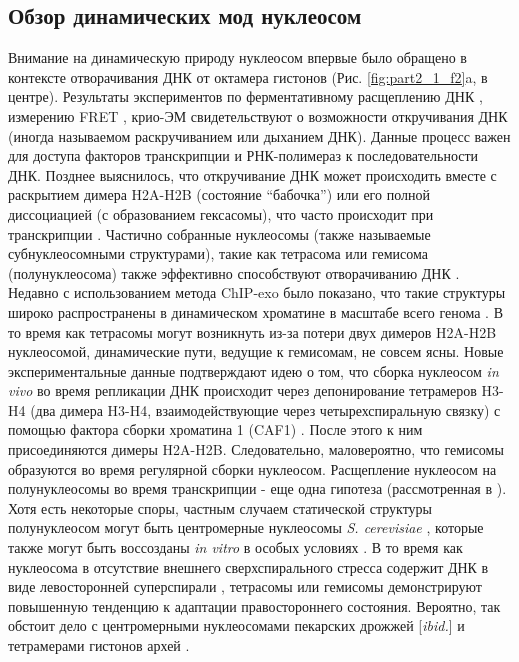 \subsection{Обзор динамических мод нуклеосом}

    Внимание на динамическую природу нуклеосом впервые было обращено в контексте отворачивания ДНК от октамера гистонов \cite{polach_mechanism_1995} (Рис. \ref{fig:part2_1_f2}a, в центре). Результаты экспериментов по ферментативному расщеплению ДНК \cite{polach_mechanism_1995}, измерению FRET \cite{li_nucleosomes_2004}, крио-ЭМ \cite{bilokapic_histone_2018} свидетельствуют о возможности откручивания ДНК (иногда называемом раскручиванием или дыханием ДНК). Данные процесс важен для доступа факторов транскрипции \cite{zaret_pioneer_2016,li_nucleosomes_2004} и РНК-полимераз \cite{bondarenko_nucleosomes_2006} к последовательности ДНК. Позднее выяснилось, что откручивание ДНК может происходить вместе с раскрытием димера H2A-H2B (состояние ``бабочка'') \cite{bohm_nucleosome_2011} или его полной диссоциацией (с образованием гексасомы), что часто происходит при транскрипции \cite{kireeva_nucleosome_2002}. Частично собранные нуклеосомы (также называемые субнуклеосомными структурами), такие как тетрасома или гемисома (полунуклеосома) также эффективно способствуют отворачиванию ДНК \cite{rychkov_partially_2017}. Недавно с использованием метода ChIP-exo было показано, что такие структуры широко распространены в динамическом хроматине в масштабе всего генома  \cite{rhee_subnucleosomal_2014}. В то время как тетрасомы могут возникнуть из-за потери двух димеров H2A-H2B нуклеосомой, динамические пути, ведущие к гемисомам, не совсем ясны. Новые экспериментальные данные подтверждают идею о том, что сборка нуклеосом \textit{in vivo} во время репликации ДНК происходит через депонирование тетрамеров H3-H4 (два димера H3-H4, взаимодействующие через четырехспиральную связку) с помощью фактора сборки хроматина 1 (CAF1) \cite{sauer_insights_2017,mattiroli_dna-mediated_2017}. После этого к ним присоединяются димеры H2A-H2B. Следовательно, маловероятно, что гемисомы образуются во время регулярной сборки нуклеосом. Расщепление нуклеосом на полунуклеосомы во время транскрипции - еще одна гипотеза (рассмотренная в \cite{zlatanova_nucleosome_2009}). Хотя есть некоторые споры, частным случаем статической структуры полунуклеосом могут быть центромерные нуклеосомы \textit{S. cerevisiae} \cite{henikoff_remarkable_2017}, которые также могут быть воссозданы \textit{in vitro} в особых условиях \cite{furuyama_reconstitution_2013}. В то время как нуклеосома в отсутствие внешнего сверхспирального стресса содержит ДНК в виде левосторонней суперспирали \cite{bancaud_structural_2006}, тетрасомы или гемисомы демонстрируют повышенную тенденцию к адаптации правостороннего состояния. Вероятно, так обстоит дело с центромерными нуклеосомами пекарских дрожжей [\textit{ibid.}] и тетрамерами гистонов архей \cite{marc_archaeal_2002}.




